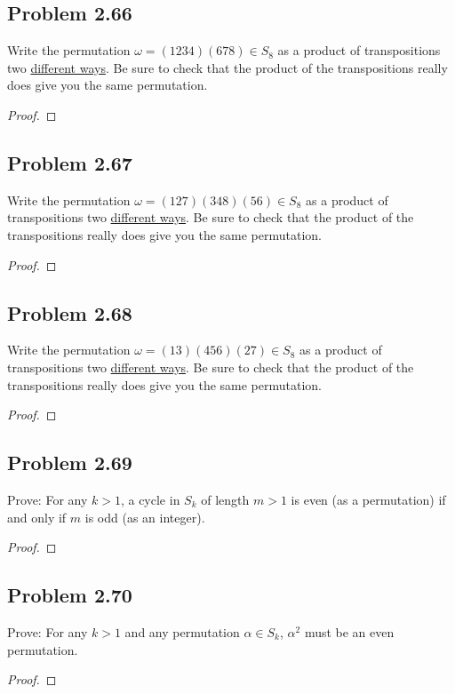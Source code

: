 \documentclass{amsbook}
\begin{document}
			\subsection*{Problem 2.66}
			\label{sub:problem_2_66}
			Write the permutation $\omega = (1234)(678) \in S_{8}$ as a product of transpositions two \underline{different ways}. 
			Be sure to check that the product of the transpositions really does give you the same permutation.
			\begin{proof}
			\end{proof}

			\subsection*{Problem 2.67}
			\label{sub:problem_2_67}
			Write the permutation $\omega = (127)(348)(56) \in S_{8}$ as a product of transpositions two \underline{different ways}. 
			Be sure to check that the product of the transpositions really does give you the same permutation.
			\begin{proof}
			\end{proof}

			\subsection*{Problem 2.68}
			\label{sub:problem_2_68}
			Write the permutation $\omega = (13)(456)(27) \in S_{8}$ as a product of transpositions two \underline{different ways}. 
			Be sure to check that the product of the transpositions really does give you the same permutation.
			\begin{proof}
			\end{proof}

			\subsection*{Problem 2.69}
			\label{sub:problem_2_69}
			Prove: For any $k > 1$, a cycle in $S_{k}$ of length $m > 1$ is even (as a permutation) if and only if $m$ is odd (as an integer).
			\begin{proof}
			\end{proof}

			\subsection*{Problem 2.70}
			\label{sub:problem_2_70}
			Prove: For any $k > 1$ and any permutation $\alpha \in S_{k}$, $\alpha^{2}$ must be an even permutation.
			\begin{proof}
			\end{proof}
\end{document}
